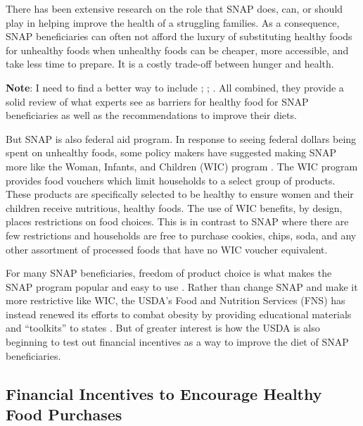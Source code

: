 \documentclass[12pt,letterpaperpaper,]{book}
\begin{document}
There has been extensive research on the role that SNAP does, can, or
should play in helping improve the health of a struggling families. As a
consequence, SNAP beneficiaries can often not afford the luxury of
substituting healthy foods for unhealthy foods when unhealthy foods can
be cheaper, more accessible, and take less time to prepare. It is a
costly trade-off between hunger and health.

\textbf{Note}: I need to find a better way to include
\citet{blumenthal_strategies_2014}; \citet{leung_qualitative_2013};
\citet{cawley_economy_2015}. All combined, they provide a solid review
of what experts see as barriers for healthy food for SNAP beneficiaries
as well as the recommendations to improve their diets.

\textbar{}\textbar{}But SNAP is also federal aid program. In response to
seeing federal dollars being spent on unhealthy foods, some policy
makers have suggested making SNAP more like the Woman, Infants, and
Children (WIC) program \citep{scott_wisconsin_2013}. The WIC program
provides food vouchers which limit households to a select group of
products. These products are specifically selected to be healthy to
ensure women and their children receive nutritious, healthy foods. The
use of WIC benefits, by design, places restrictions on food choices.
This is in contrast to SNAP where there are few restrictions and
households are free to purchase cookies, chips, soda, and any other
assortment of processed foods that have no WIC voucher
equivalent.\textbar{}\textbar{}

For many SNAP beneficiaries, freedom of product choice is what makes the
SNAP program popular and easy to use
\citep{lindsey_wic_2013, edin_snap_2013}. Rather than change SNAP and
make it more restrictive like WIC, the USDA's Food and Nutrition
Services (FNS) has instead renewed its efforts to combat obesity by
providing educational materials and ``toolkits'' to states
\citep{multiple_supplemental_2017}. But of greater interest is how the
USDA is also beginning to test out financial incentives as a way to
improve the diet of SNAP beneficiaries.

\subsection*{Financial Incentives to Encourage Healthy Food
Purchases}\label{financial-incentives-to-encourage-healthy-food-purchases}
\end{document}

